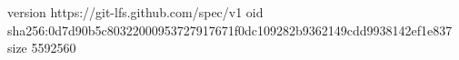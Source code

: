 version https://git-lfs.github.com/spec/v1
oid sha256:0d7d90b5c80322000953727917671f0dc109282b9362149cdd9938142ef1e837
size 5592560
